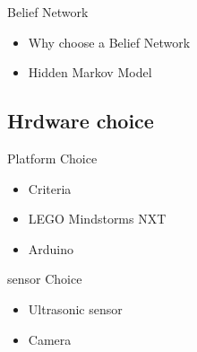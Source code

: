 \begin{frame}{Belief Network}
\begin{itemize}
 \item Why choose a Belief Network
 \item Hidden Markov Model
\end{itemize}
\end{frame}

\subsection{Hrdware choice}
\begin{frame}{Platform Choice}
\begin{itemize}
 \item Criteria
 \item LEGO Mindstorms NXT
 \item Arduino
\end{itemize}
\end{frame}

\begin{frame}{sensor Choice}
\begin{itemize}
 \item Ultrasonic sensor
 \item Camera
\end{itemize}
\end{frame}
 

